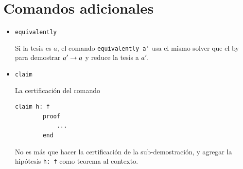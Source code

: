 \section{Comandos adicionales}

\begin{itemize}
    \item \lstinline{equivalently}
    
    Si la tesis es $a$, el comando \lstinline{equivalently a'} usa el mismo solver que el by para demostrar $a' \to a$ y reduce la tesis a $a'$.

    \item \lstinline{claim}
    
    La certificación del comando
    \begin{lstlisting}[numbers=none]
        claim h: f
        proof
            ...
        end
    \end{lstlisting}
    
    No es más que hacer la certificación de la sub-demostración, y agregar la hipótesis \lstinline{h: f} como teorema al contexto.

\end{itemize}
